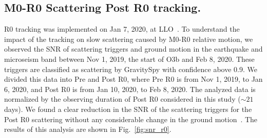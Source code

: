 \documentclass[12pt]{iopart}
\begin{document}
\subsection{M0-R0 Scattering Post R0 tracking.}
R0 tracking was implemented on Jan 7, 2020, at LLO~\cite{alog_anamaria}. To understand the impact of the tracking on slow scattering caused by M0-R0 relative motion, we observed the SNR of scattering triggers and ground motion in the earthquake and microseism band between Nov 1, 2019, the start of O3b and Feb 8, 2020. These triggers are classified as scattering by GravitySpy with confidence above 0.9. We divided this data into Pre and Post R0, where Pre R0 is from Nov 1, 2019, to Jan 6, 2020, and Post R0 is from Jan 10, 2020, to Feb 8, 2020. The analyzed data is normalized by the observing duration of Post R0 considered in this study ($\sim 21$ days). We found a clear reduction in the SNR of the scattering triggers for the Post R0 scattering without any considerable change in the ground motion~\cite{alogsid_R0}. The results of this analysis are shown in Fig.~\ref{fig:snr_r0}.
\par
\end{document}
